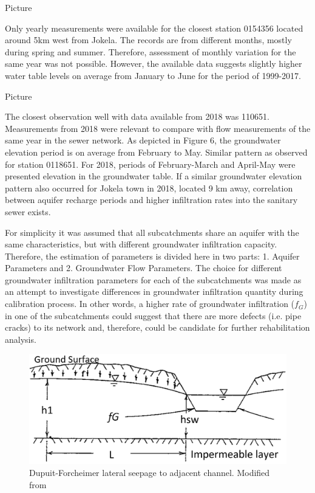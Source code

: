 Picture

Only yearly measurements were available for the closest station 0154356 located around 5km west from Jokela. The records are from different months, mostly during spring and summer. Therefore, assessment of monthly variation for the same year was not possible. However, the available data suggests slightly higher water table levels on average from January to June for the period of 1999-2017.

Picture

The closest observation well with data available from 2018 was 110651. Measurements from 2018 were relevant to compare with flow measurements of the same year in the sewer network. As depicted in Figure 6, the groundwater elevation period is on average from February to May. Similar pattern as observed for station 0118651. For 2018, periods of February-March and April-May were presented elevation in the groundwater table. If a similar groundwater elevation pattern also occurred for Jokela town in 2018, located 9 km away, correlation between aquifer recharge periods and higher infiltration rates into the sanitary sewer exists. 
    

For simplicity it was assumed that all subcatchments share an aquifer with the same characteristics, but with different groundwater infiltration capacity. Therefore, the estimation of parameters is divided here in two parts: 1. Aquifer Parameters and 2. Groundwater Flow Parameters. The choice for different groundwater infiltration parameters for each of the subcatchments was made as an attempt to investigate differences in groundwater infiltration quantity during calibration process. In other words, a higher rate of groundwater infiltration ($f_G$) in one of the subcatchments could suggest that there are more defects (i.e. pipe cracks) to its network and, therefore, could be candidate for further rehabilitation analysis.

\begin{figure}[h]
    \centering
	\includegraphics[scale=0.4]{figures/dfscheme.png}
	\caption{Dupuit-Forcheimer lateral seepage to adjacent channel. Modified from} %
	\label{fig:dfscheme}
\end{figure}

